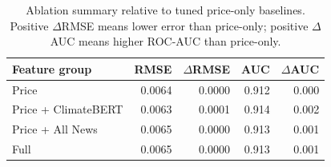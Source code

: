 \begin{table}[H]
  \caption{Ablation summary relative to tuned price-only baselines. Positive $\Delta$RMSE means lower error than price-only; positive $\Delta$AUC means higher ROC-AUC than price-only.}
  \label{tab:ablation}
  \centering
  \small
  \setlength{\tabcolsep}{3pt}
  \begin{tabular}{lrrrr}
    \toprule
    Feature group & RMSE & $\Delta$RMSE & AUC & $\Delta$AUC \\
    \midrule
    Price & 0.0064 & 0.0000 & 0.912 & 0.000 \\
    Price + ClimateBERT & 0.0063 & 0.0001 & 0.914 & 0.002 \\
    Price + All News & 0.0065 & 0.0000 & 0.913 & 0.001 \\
    Full & 0.0065 & 0.0000 & 0.913 & 0.001 \\
    \bottomrule
  \end{tabular}
\end{table}

